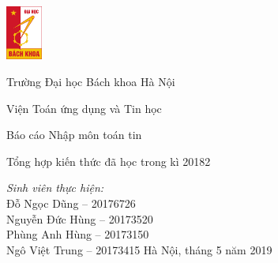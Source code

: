 \documentclass[14pt]{extarticle}
\begin{document}
\begin{titlepage}
	\parbox{4.2em}{
		\includegraphics[width=3.2em]{resources/bk.jpg}
	}
	\parbox{\textwidth-4.6em}{
		{\LARGE Trường Đại học Bách khoa Hà Nội\par}
		{\Large Viện Toán ứng dụng và Tin học}
	}
	\vfill\vfill
	\begin{center}
		{\Large Báo cáo Nhập môn toán tin}\par
		{\LARGE Tổng hợp kiến thức đã học trong kì 20182}\par
		\vfill
		\textit{Sinh viên thực hiện:}\\
		Đỗ Ngọc Dũng -- 20176726\\
		Nguyễn Đức Hùng -- 20173520\\
		Phùng Anh Hùng -- 20173150\\
		Ngô Việt Trung -- 20173415
		\vfill
		Hà Nội, tháng 5 năm 2019
	\end{center}
\end{titlepage}
\end{document}
